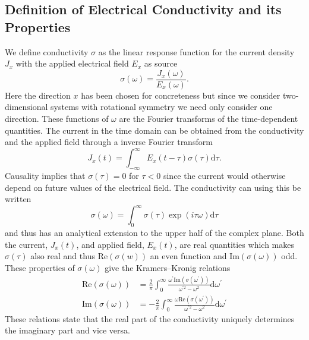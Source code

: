 \documentclass[12pt]{report}
\renewcommand{\d}{\ensuremath{\mathrm{d}}}
\renewcommand{\i}{\ensuremath{i}}
\newcommand{\re}{\ensuremath{\mathrm{Re}}}
\newcommand{\im}{\ensuremath{\mathrm{Im}}}
\begin{document}
\subsection{Definition of Electrical Conductivity and its Properties}
We define conductivity $\sigma$ as the linear response function for the current density $J_x$ with the applied electrical field $E_x$ as source
\begin{equation}
 \sigma(\omega)=\frac{J_x(\omega)}{E_x(\omega)}\label{sigma}.
\end{equation}
Here the direction $x$ has been chosen for concreteness but since we consider two-dimensional systems with rotational symmetry we need only consider one direction. These functions of $\omega$ are the Fourier transforms of the time-dependent quantities. The current in the time domain can be obtained from the conductivity and the applied field through a inverse Fourier transform
\begin{equation}
 J_x(t)=\int_{-\infty}^\infty E_x(t-\tau)\sigma(\tau)\d \tau.
\end{equation}
Causality implies that $\sigma(\tau)=0$ for $\tau<0$ since the current would otherwise depend on future values of the electrical field. The conductivity can using this be written
\begin{equation}
 \sigma(\omega)=\int_0^\infty\sigma(\tau)\exp(\i\tau\omega)\d\tau
\end{equation}
and thus has an analytical extension to the upper half of the complex plane. Both the current, $J_x(t)$, and applied field, $E_x(t)$, are real quantities which makes $\sigma(\tau)$ also real and thus $\re(\sigma(w))$ an even function and $\im(\sigma(\omega))$ odd. These properties of $\sigma(\omega)$ give the Kramers–Kronig relations
\begin{equation}
\begin{split}
 \re(\sigma(\omega))&=\frac{2}{\pi}\int_0^\infty\frac{\omega^\prime\im(\sigma(\omega^\prime))}{\omega^{\prime 2}-\omega^2}\d \omega^\prime\\
\im(\sigma(\omega))&=-\frac{2}{\pi}\int_0^\infty\frac{\omega\re(\sigma(\omega^\prime))}{\omega^{\prime 2}-\omega^2}\d \omega^\prime\label{kk}
\end{split}
\end{equation}
These relations state that the real part of the conductivity uniquely determines the imaginary part and vice versa.
\end{document}

